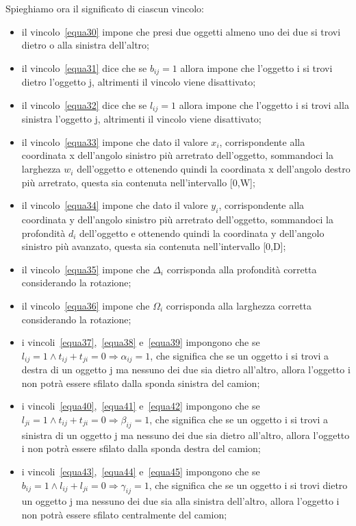 \newpage
Spieghiamo ora il significato di ciascun vincolo:
\begin{itemize}
	\item il vincolo~\eqref{equa30} impone che presi due oggetti almeno uno dei due si trovi dietro o alla sinistra dell'altro;
	\item il vincolo~\eqref{equa31} dice che se $b_{ij} = 1$ allora impone che l'oggetto i si trovi dietro l'oggetto j, altrimenti il vincolo viene disattivato;
	\item il vincolo~\eqref{equa32} dice che se $l_{ij} = 1$ allora impone che l'oggetto i si trovi alla sinistra l'oggetto j, altrimenti il vincolo viene disattivato;
	\item il vincolo~\eqref{equa33} impone che dato il valore $x_i$, corrispondente alla coordinata x dell'angolo sinistro più arretrato dell'oggetto, sommandoci la larghezza $w_i$ dell'oggetto e ottenendo quindi la coordinata x dell'angolo destro più arretrato, questa sia contenuta nell'intervallo [0,W];
	\item il vincolo~\eqref{equa34} impone che dato il valore $y_i$, corrispondente alla coordinata y dell'angolo sinistro più arretrato dell'oggetto, sommandoci la profondità $d_i$ dell'oggetto e ottenendo quindi la coordinata y dell'angolo sinistro più avanzato, questa sia contenuta nell'intervallo [0,D];
	\item il vincolo~\eqref{equa35} impone che $\Delta_i$ corrisponda alla profondità corretta considerando la rotazione;
	\item il vincolo~\eqref{equa36} impone che $\Omega_i$ corrisponda alla larghezza corretta considerando la rotazione;
	\item i vincoli~\eqref{equa37},~\eqref{equa38} e~\eqref{equa39} impongono che se $l_{ij} = 1 \land t_{ij} + t_{ji} = 0 \Rightarrow \alpha_{ij} = 1$, che significa che se un oggetto i si trovi a destra di un oggetto j ma nessuno dei due sia dietro all'altro, allora l'oggetto i non potrà essere sfilato dalla sponda sinistra del camion;
	\item i vincoli~\eqref{equa40},~\eqref{equa41} e~\eqref{equa42} impongono che se $l_{ji} = 1 \land t_{ij} + t_{ji} = 0 \Rightarrow \beta_{ij} = 1$, che significa che se un oggetto i si trovi a sinistra di un oggetto j ma nessuno dei due sia dietro all'altro, allora l'oggetto i non potrà essere sfilato dalla sponda destra del camion;
	\item i vincoli~\eqref{equa43},~\eqref{equa44} e~\eqref{equa45} impongono che se $b_{ij} = 1 \land l_{ij} + l_{ji} = 0 \Rightarrow \gamma_{ij} = 1$, che significa che se un oggetto i si trovi dietro un oggetto j ma nessuno dei due sia alla sinistra dell'altro, allora l'oggetto i non potrà essere sfilato centralmente del camion;

\end{itemize}
